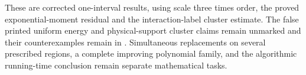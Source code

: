 These are corrected one-interval results, using scale three times order,
the proved exponential-moment residual and the interaction-label cluster
estimate. The false printed uniform energy and physical-support cluster
claims remain unmarked and their counterexamples remain in
\cite{gap:alvv16_soft_truncation_energy_estimate,gap:alvv16_cluster_approximation}.
Simultaneous replacements on several prescribed regions, a complete
improving polynomial family, and the algorithmic running-time conclusion
remain separate mathematical tasks.
